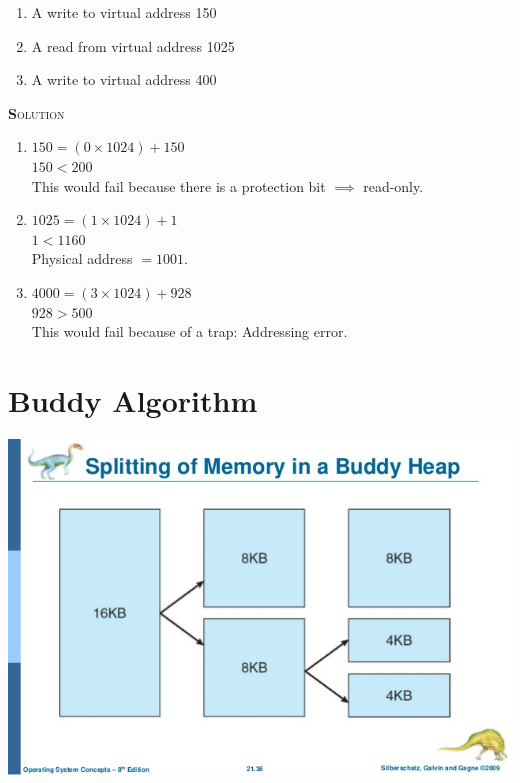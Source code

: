\documentclass{article}
\newcommand{\smallcaps}[1]{\textsc{\textbf #1}\\}
\begin{document}
\begin{multicols}{2}
    \begin{enumerate}
      \item A write to virtual address 150
      \item A read from virtual address 1025
      \item A write to virtual address 400
    \end{enumerate}

    \smallcaps{Solution}

    \begin{enumerate}
      \item
        $150 = (0 \times 1024) + 150$ \\
        $150 < 200$ \\
        This would fail because there is a protection bit $\implies$ read-only.
      \item
        $1025 = (1 \times 1024) + 1$ \\
        $1 < 1160$ \\
        Physical address $= 1001$.
      \item
        $4000 = (3 \times 1024) + 928$ \\
        $928 > 500$ \\
        This would fail because of a trap: Addressing error.
    \end{enumerate}

    \section*{Buddy Algorithm}
    \begin{center}
      \includegraphics[scale=0.4]{buddy_algorithm.png} \\
    \end{center}


\end{multicols}
\end{document}
